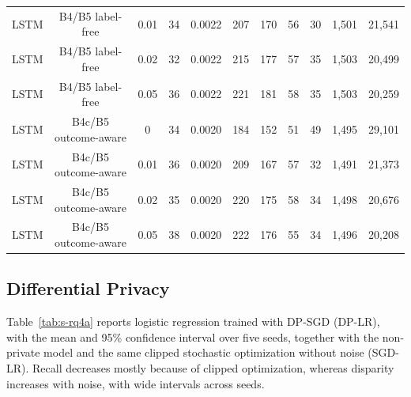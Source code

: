 \documentclass[10pt,onecolumn,letterpaper]{article}
\begin{document}
\begin{table}[!t]
{\begin{tabular}{lcccccccccc}
LSTM & B4/B5 label-free & 0.01 & 34 & 0.0022 & 207 & 170 & 56 & 30 & 1,501 & 21,541 \\
LSTM & B4/B5 label-free & 0.02 & 32 & 0.0022 & 215 & 177 & 57 & 35 & 1,503 & 20,499 \\
LSTM & B4/B5 label-free & 0.05 & 36 & 0.0022 & 221 & 181 & 58 & 35 & 1,503 & 20,259 \\
LSTM & B4c/B5 outcome-aware & 0 & 34 & 0.0020 & 184 & 152 & 51 & 49 & 1,495 & 29,101 \\
LSTM & B4c/B5 outcome-aware & 0.01 & 36 & 0.0020 & 209 & 167 & 57 & 32 & 1,491 & 21,373 \\
LSTM & B4c/B5 outcome-aware & 0.02 & 35 & 0.0020 & 220 & 175 & 58 & 34 & 1,498 & 20,676 \\
LSTM & B4c/B5 outcome-aware & 0.05 & 38 & 0.0020 & 222 & 176 & 55 & 34 & 1,496 & 20,208 \\
\bottomrule
\end{tabular}}
\end{table}

\subsection{Differential Privacy}
Table~\ref{tab:s-rq4a} reports logistic regression trained with DP-SGD (DP-LR), with the mean and 95\% confidence interval over five seeds, together with the non-private model and the same clipped stochastic optimization without noise (SGD-LR). Recall decreases mostly because of clipped optimization, whereas disparity increases with noise, with wide intervals across seeds.

\begin{table}[!t]
\caption{DP Training and Alert Burden, Mean and 95\% CI Over Five Seeds (r4.2)\label{tab:s-rq4a}}
\centering
{}
\end{table}
\end{document}
